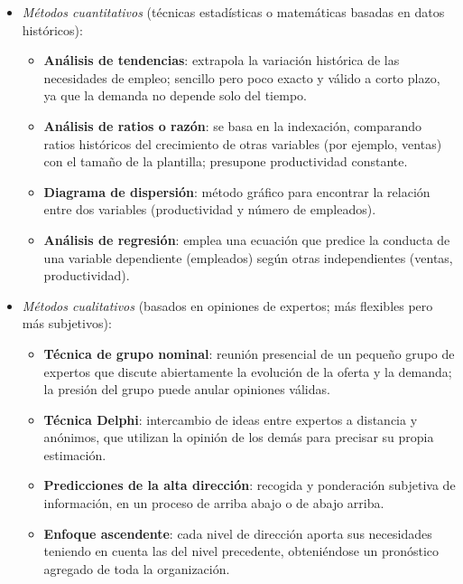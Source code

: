 \documentclass[12pt]{book} %
\providecommand{\tightlist}{%
  \setlength{\itemsep}{0pt}\setlength{\parskip}{0pt}}
\begin{document}
\begin{itemize}
\tightlist
\item
  \emph{Métodos cuantitativos} (técnicas estadísticas o matemáticas
  basadas en datos históricos):

  \begin{itemize}
  \tightlist
  \item
    \textbf{Análisis de tendencias}: extrapola la variación histórica de
    las necesidades de empleo; sencillo pero poco exacto y válido a
    corto plazo, ya que la demanda no depende solo del tiempo.
  \item
    \textbf{Análisis de ratios o razón}: se basa en la indexación,
    comparando ratios históricos del crecimiento de otras variables (por
    ejemplo, ventas) con el tamaño de la plantilla; presupone
    productividad constante.
  \item
    \textbf{Diagrama de dispersión}: método gráfico para encontrar la
    relación entre dos variables (productividad y número de empleados).
  \item
    \textbf{Análisis de regresión}: emplea una ecuación que predice la
    conducta de una variable dependiente (empleados) según otras
    independientes (ventas, productividad).
  \end{itemize}
\item
  \emph{Métodos cualitativos} (basados en opiniones de expertos; más
  flexibles pero más subjetivos):

  \begin{itemize}
  \tightlist
  \item
    \textbf{Técnica de grupo nominal}: reunión presencial de un pequeño
    grupo de expertos que discute abiertamente la evolución de la oferta
    y la demanda; la presión del grupo puede anular opiniones válidas.
  \item
    \textbf{Técnica Delphi}: intercambio de ideas entre expertos a
    distancia y anónimos, que utilizan la opinión de los demás para
    precisar su propia estimación.
  \item
    \textbf{Predicciones de la alta dirección}: recogida y ponderación
    subjetiva de información, en un proceso de arriba abajo o de abajo
    arriba.
  \item
    \textbf{Enfoque ascendente}: cada nivel de dirección aporta sus
    necesidades teniendo en cuenta las del nivel precedente,
    obteniéndose un pronóstico agregado de toda la organización.
  \end{itemize}
\end{itemize}
\end{document}
